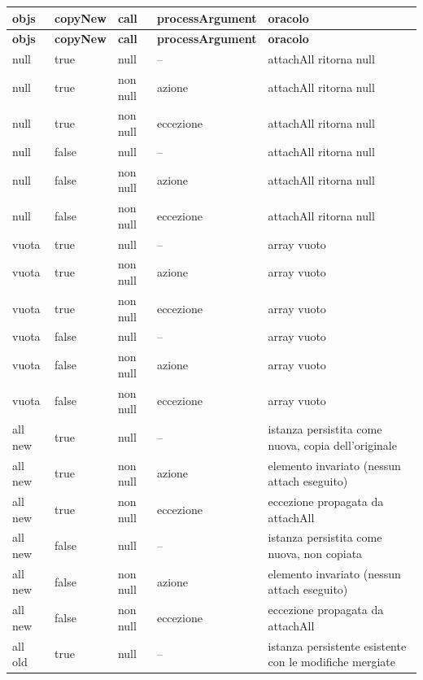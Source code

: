 {\footnotesize\setlength{\tabcolsep}{3pt}
\begin{longtable}{>{\raggedright\arraybackslash}p{}>{\raggedright\arraybackslash}p{}>{\raggedright\arraybackslash}p{}>{\raggedright\arraybackslash}p{}>{\raggedright\arraybackslash}p{}}
\toprule
\textbf{objs} & \textbf{copyNew} & \textbf{call} & \textbf{processArgument} & \textbf{oracolo} \\
\midrule
\endfirsthead
\toprule
\textbf{objs} & \textbf{copyNew} & \textbf{call} & \textbf{processArgument} & \textbf{oracolo} \\
\midrule
\endhead
\bottomrule
\endfoot
null & true & null & -- & attachAll ritorna null \\
null & true & non null & azione & attachAll ritorna null \\
null & true & non null & eccezione & attachAll ritorna null \\
null & false & null & -- & attachAll ritorna null \\
null & false & non null & azione & attachAll ritorna null \\
null & false & non null & eccezione & attachAll ritorna null \\
vuota & true & null & -- & array vuoto \\
vuota & true & non null & azione & array vuoto \\
vuota & true & non null & eccezione & array vuoto \\
vuota & false & null & -- & array vuoto \\
vuota & false & non null & azione & array vuoto \\
vuota & false & non null & eccezione & array vuoto \\
all new & true & null & -- & istanza persistita come nuova, copia dell'originale \\
all new & true & non null & azione & elemento invariato (nessun attach eseguito) \\
all new & true & non null & eccezione & eccezione propagata da attachAll \\
all new & false & null & -- & istanza persistita come nuova, non copiata \\
all new & false & non null & azione & elemento invariato (nessun attach eseguito) \\
all new & false & non null & eccezione & eccezione propagata da attachAll \\
all old & true & null & -- & istanza persistente esistente con le modifiche mergiate \\

\end{longtable}}
